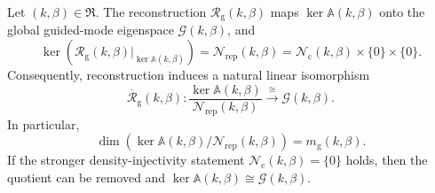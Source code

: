 \begin{theorem}
\label{thm:main-kernel-equivalence}
Let $(k,\beta)\in\mathfrak R$.  The reconstruction
$\mathcal R_{\mathrm g}(k,\beta)$ maps
$\ker\mathbb A(k,\beta)$ onto the global guided-mode eigenspace
$\mathcal G(k,\beta)$, and
\begin{equation}
  \ker\!\left(
  \mathcal R_{\mathrm g}(k,\beta)|_{\ker\mathbb A(k,\beta)}
  \right)
  =\mathcal N_{\mathrm{rep}}(k,\beta)
  =\mathcal N_{\mathrm c}(k,\beta)\times\{0\}\times\{0\}.
  \label{eq:representation-kernel-identification}
\end{equation}
Consequently, reconstruction induces a natural linear isomorphism
\begin{equation}
  \overline{\mathcal R}_{\mathrm g}(k,\beta):
  \frac{\ker\mathbb A(k,\beta)}{\mathcal N_{\mathrm{rep}}(k,\beta)}
  \xrightarrow{\ \cong\ }\mathcal G(k,\beta).
  \label{eq:main-quotient-isomorphism}
\end{equation}
In particular,
\begin{equation}
  \dim\!\left(
  \ker\mathbb A(k,\beta)/\mathcal N_{\mathrm{rep}}(k,\beta)
  \right)=m_{\mathrm g}(k,\beta).
  \label{eq:multiplicity-preservation}
\end{equation}
If the stronger density-injectivity statement
$\mathcal N_{\mathrm c}(k,\beta)=\{0\}$ holds, then the quotient can be
removed and $\ker\mathbb A(k,\beta)\cong\mathcal G(k,\beta)$.
\end{theorem}
